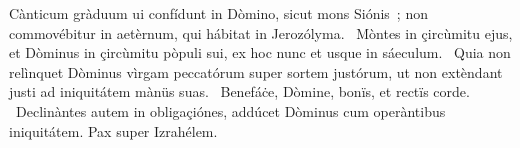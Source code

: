 { Cànticum gràduum}
{%
ui confídunt in Dòmino, sicut mons Siónis~; non commovébitur in aetèrnum, qui hábitat in Jerozólyma. 
~Mòntes in çircùmitu ejus, et Dòminus in çircùmitu pòpuli sui, ex hoc nunc et usque in sáeculum. 
~Quia non relìnquet Dòminus vìrgam peccatórum super sortem justórum, ut non extèndant justi ad iniquitátem mànüs suas. 
~Benefáċe, Dòmine, bonïs, et rectïs corde. 
~Declinàntes autem in obligaçiónes, addúcet Dòminus cum operàntibus iniquitátem. Pax super Izrahélem. 
}

